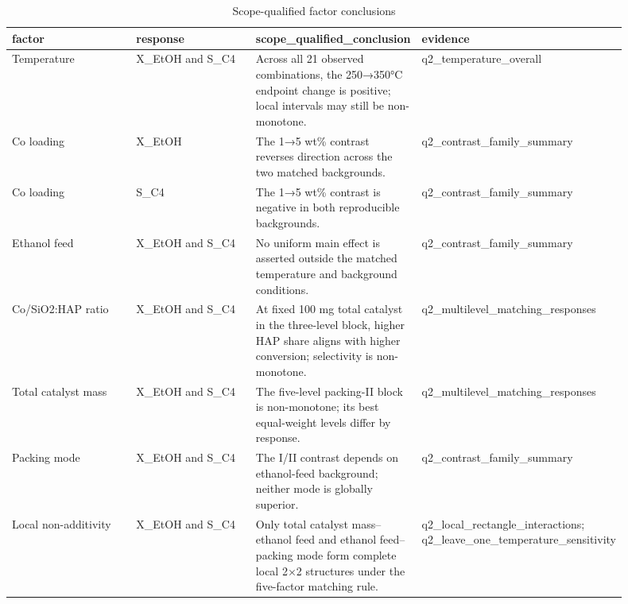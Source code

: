 \begingroup\scriptsize\setlength{\tabcolsep}{1.5pt}\renewcommand{\arraystretch}{1.1}
\begin{longtable}{>{\raggedright\arraybackslash}p{0.225\linewidth} >{\raggedright\arraybackslash}p{0.225\linewidth} >{\raggedright\arraybackslash}p{0.225\linewidth} >{\raggedright\arraybackslash}p{0.225\linewidth}}
\caption{Scope-qualified factor conclusions}\label{tab:q2-conclusions}\\
\toprule
factor & response & scope\_\allowbreak{}qualified\_\allowbreak{}conclusion & evidence \\
\midrule
\endhead
Temperature & X\_\allowbreak{}EtOH and S\_\allowbreak{}C4 & Across all 21 observed combinations, the 250→350°C endpoint change is positive; local intervals may still be non-monotone. & q2\_\allowbreak{}temperature\_\allowbreak{}overall \\
Co loading & X\_\allowbreak{}EtOH & The 1→5 wt\% contrast reverses direction across the two matched backgrounds. & q2\_\allowbreak{}contrast\_\allowbreak{}family\_\allowbreak{}summary \\
Co loading & S\_\allowbreak{}C4 & The 1→5 wt\% contrast is negative in both reproducible backgrounds. & q2\_\allowbreak{}contrast\_\allowbreak{}family\_\allowbreak{}summary \\
Ethanol feed & X\_\allowbreak{}EtOH and S\_\allowbreak{}C4 & No uniform main effect is asserted outside the matched temperature and background conditions. & q2\_\allowbreak{}contrast\_\allowbreak{}family\_\allowbreak{}summary \\
Co/SiO2:HAP ratio & X\_\allowbreak{}EtOH and S\_\allowbreak{}C4 & At fixed 100 mg total catalyst in the three-level block, higher HAP share aligns with higher conversion; selectivity is non-monotone. & q2\_\allowbreak{}multilevel\_\allowbreak{}matching\_\allowbreak{}responses \\
Total catalyst mass & X\_\allowbreak{}EtOH and S\_\allowbreak{}C4 & The five-level packing-II block is non-monotone; its best equal-weight levels differ by response. & q2\_\allowbreak{}multilevel\_\allowbreak{}matching\_\allowbreak{}responses \\
Packing mode & X\_\allowbreak{}EtOH and S\_\allowbreak{}C4 & The I/II contrast depends on ethanol-feed background; neither mode is globally superior. & q2\_\allowbreak{}contrast\_\allowbreak{}family\_\allowbreak{}summary \\
Local non-additivity & X\_\allowbreak{}EtOH and S\_\allowbreak{}C4 & Only total catalyst mass–ethanol feed and ethanol feed–packing mode form complete local 2×2 structures under the five-factor matching rule. & q2\_\allowbreak{}local\_\allowbreak{}rectangle\_\allowbreak{}interactions; q2\_\allowbreak{}leave\_\allowbreak{}one\_\allowbreak{}temperature\_\allowbreak{}sensitivity \\
\bottomrule
\end{longtable}
\endgroup
